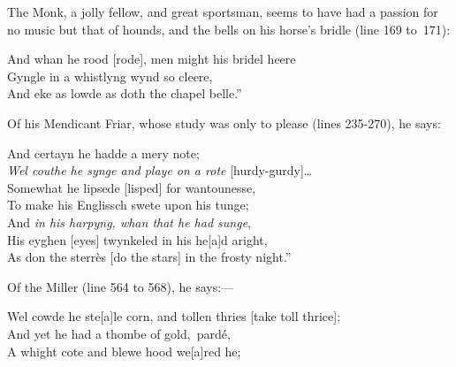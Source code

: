 The Monk, a jolly fellow, and great sportsman, seems to have had a passion for
no music but that of hounds, and the bells on his horse’s bridle (line 169 to~171):
\begin{scverse}And whan he rood [rode], men might his bridel heere\\
Gyngle in a whistlyng wynd so cleere,\\
And eke as lowde as doth the chapel belle.”
\end{scverse}

Of his Mendicant Friar, whose study was only to please (lines 235-270),
he says:
\begin{scverse}And certayn he hadde a mery note;\\
\textit{Wel couthe he synge and playe on a rote }[hurdy-gurdy]\ldots\  \\
Somewhat he lipsede [lisped] for wantounesse,\\
To make his Englissch swete upon his tunge;\\
And \textit{in his harpyng, whan that he had sunge},\\
His eyghen [eyes] twynkeled in his he[a]d aright,\\
As don the sterrès [do the stars] in the frosty night.”
\end{scverse}

Of the Miller (line 564 to 568), he says:—
\begin{scverse}Wel cowde he ste[a]le corn, and tollen thries [take toll thrice];\\
And yet he had a thombe of gold,\footnotemark\ pardé,\\
A whight cote and blewe hood we[a]red he; \\
\end{scverse}



\pagebreak